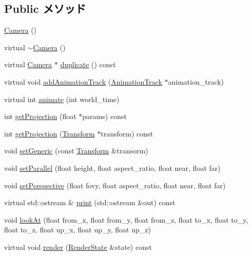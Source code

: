 \subsection*{Public メソッド}
\begin{CompactItemize}
\item 
\hyperlink{classm3g_1_1Camera_a3f3efcb2fcc75de885df29041103cd2}{Camera} ()
\item 
virtual \hyperlink{classm3g_1_1Camera_b921e886e6f14e117eb8099ccb0a3775}{$\sim$Camera} ()
\item 
virtual \hyperlink{classm3g_1_1Camera}{Camera} $\ast$ \hyperlink{classm3g_1_1Camera_6279f7f8ab52af683fadd193d7694f2d}{duplicate} () const 
\item 
virtual void \hyperlink{classm3g_1_1Camera_415c0b110f95410ded9b85e5d99a496b}{addAnimationTrack} (\hyperlink{classm3g_1_1AnimationTrack}{AnimationTrack} $\ast$animation\_\-track)
\item 
virtual int \hyperlink{classm3g_1_1Camera_8aad1ceab4c2a03609c8a42324ce484d}{animate} (int world\_\-time)
\item 
int \hyperlink{classm3g_1_1Camera_a2ebe46a4e16fee86d4f547588411302}{getProjection} (float $\ast$params) const 
\item 
int \hyperlink{classm3g_1_1Camera_9e0c204df146342990703acb744954b1}{getProjection} (\hyperlink{classm3g_1_1Transform}{Transform} $\ast$transform) const 
\item 
void \hyperlink{classm3g_1_1Camera_51c42821097e90d3f59e87676684f60a}{setGeneric} (const \hyperlink{classm3g_1_1Transform}{Transform} \&transorm)
\item 
void \hyperlink{classm3g_1_1Camera_cb4535fd75b28b4d58390962d0c0e588}{setParallel} (float height, float aspect\_\-ratio, float near, float far)
\item 
void \hyperlink{classm3g_1_1Camera_ca92a48ebe3424deac8e54c27550189d}{setPerspective} (float fovy, float aspect\_\-ratio, float near, float far)
\item 
virtual std::ostream \& \hyperlink{classm3g_1_1Camera_6fea17fa1532df3794f8cb39cb4f911f}{print} (std::ostream \&out) const 
\item 
void \hyperlink{classm3g_1_1Camera_0006b18ae0e27a031d533e987b9756a8}{lookAt} (float from\_\-x, float from\_\-y, float from\_\-z, float to\_\-x, float to\_\-y, float to\_\-z, float up\_\-x, float up\_\-y, float up\_\-z)
\item 
virtual void \hyperlink{classm3g_1_1Camera_8babc8a79b78615da51161e94029eea9}{render} (\hyperlink{structm3g_1_1RenderState}{RenderState} \&state) const 
\end{CompactItemize}
